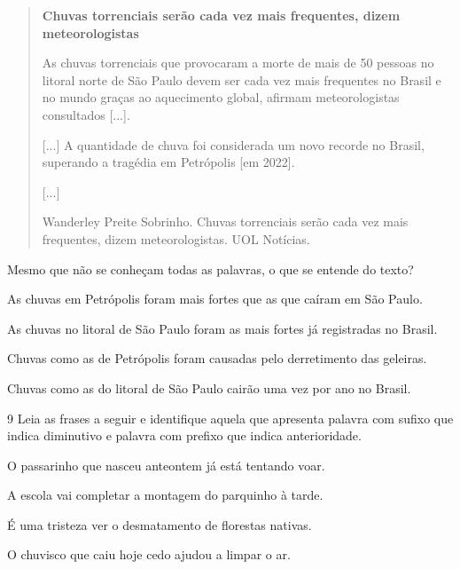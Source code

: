 \begin{quote}
\textbf{Chuvas torrenciais serão cada vez mais frequentes, dizem
meteorologistas}

As chuvas torrenciais que provocaram a morte de mais de 50 pessoas no
litoral norte de São Paulo devem ser cada vez mais frequentes no Brasil
e no mundo graças ao aquecimento global, afirmam meteorologistas
consultados {[}...{]}.

{[}...{]} A quantidade de chuva foi considerada um novo recorde no
Brasil, superando a tragédia em Petrópolis {[}em 2022{]}.

{[}...{]}

Wanderley Preite Sobrinho. Chuvas torrenciais serão cada vez mais
frequentes, dizem meteorologistas. UOL Notícias. 
\end{quote}

Mesmo que não se conheçam todas as palavras, o que se entende do texto?

\begin{escolha}
\item As chuvas em Petrópolis foram mais fortes que as que caíram em São Paulo.

\item As chuvas no litoral de São Paulo foram as mais fortes já registradas no Brasil.

\item Chuvas como as de Petrópolis foram causadas pelo derretimento das geleiras.

\item Chuvas como as do litoral de São Paulo cairão uma vez por ano no Brasil.
\end{escolha}



\num{9} Leia as frases a seguir e identifique aquela que apresenta palavra
com sufixo que indica diminutivo e palavra com prefixo que indica
anterioridade.

\begin{escolha}
\item O passarinho que nasceu anteontem já está tentando voar.

\item A escola vai completar a montagem do parquinho à tarde.

\item É uma tristeza ver o desmatamento de florestas nativas.

\item O chuvisco que caiu hoje cedo ajudou a limpar o ar.
\end{escolha}


